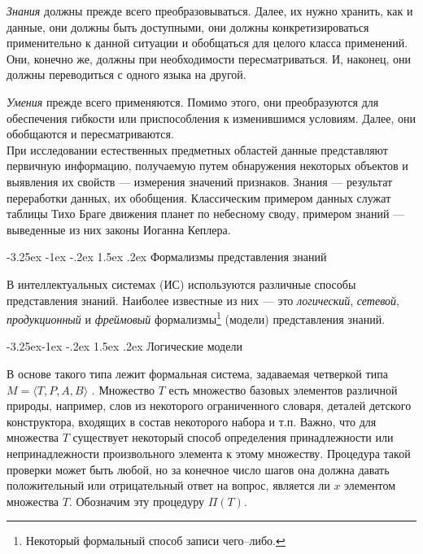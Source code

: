 \documentclass[12pt, openany, twoside]{book} %
\makeatletter
\renewcommand\section{\@startsection {section}{1}{\z@}%
                                   {-3.25ex \@plus -1ex \@minus -.2ex}%
                                   {1.5ex \@plus.2ex}%
                                   {\normalfont\large\bfseries}}
\renewcommand\subsection{\@startsection{subsection}{2}{\z@}%
                                     {-3.25ex\@plus -1ex \@minus -.2ex}%
                                     {1.5ex \@plus .2ex}%
                                     {\normalfont\normalsize\bfseries}}
\makeatother
\begin{document}
    {\em Знания} должны прежде всего преобразовываться. Далее, их нужно хранить, как и данные, они должны быть доступными, они должны конкретизироваться применительно к данной ситуации и обобщаться для целого класса применений. Они, конечно же, должны при необходимости пересматриваться. И, наконец, они должны переводиться с одного языка на другой.

    {\em Умения} прежде всего применяются. Помимо этого, они преобразуются для обеспечения гибкости или приспособления к изменившимся условиям. Далее, они обобщаются и пересматриваются.\\[1ex]

При исследовании естественных предметных областей данные представляют первичную информацию, получаемую путем обнаружения некоторых объектов и выявления их свойств --- измерения значений признаков. Знания --- результат переработки данных, их обобщения. Классическим примером данных служат таблицы Тихо Браге движения планет по небесному своду, примером знаний --- выведенные из них законы Иоганна Кеплера.

\section{Формализмы представления знаний}
\label{sec:knowlege_repr}


В интеллектуальных системах (ИС) используются различные способы представления знаний. Наиболее известные из них --- это {\em логический}, {\em сетевой}, {\em продукционный} и {\em фреймовый} формализмы\footnote{Некоторый формальный способ записи чего--либо.} (модели) представления знаний.

\subsection{Логические модели}

 В основе такого типа лежит формальная система, задаваемая четверкой типа $M=\langle T, P, A, B\rangle$ \cite{AIDictionary}. Множество $T$ есть множество базовых элементов различной природы, например, слов из некоторого ограниченного словаря, деталей детского конструктора, входящих в состав некоторого набора и т.п. Важно, что для множества $T$ существует некоторый способ определения принадлежности или непринадлежности произвольного элемента к этому множеству. Процедура такой проверки может быть любой, но за конечное число шагов она должна давать положительный или отрицательный ответ на вопрос, является ли $x$ элементом множества $T$. Обозначим эту процедуру $\Pi(T)$.
\end{document}
